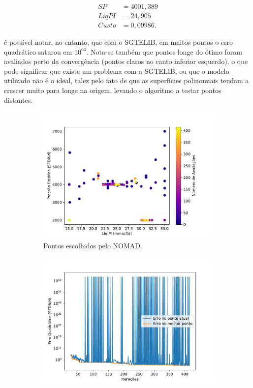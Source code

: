 \begin{align*}
SP&= 4001,389 \\
Liq PI &= 24,905 \\
Custo &= 0,09986.
\end{align*}

é possível notar, no entanto, que com o SGTELIB, em muitos pontos o erro quadrático saturou em $10^{64}$. Nota-se também que pontos longe do ótimo foram avaliados perto da convergência (pontos claros no canto inferior esquerdo), o que pode significar que existe um problema com a SGTELIB, ou que o modelo utilizado não é o ideal, talez pelo fato de que as superfícies polinomiais tendam a crescer muito para longe na origem, levando o algoritmo a testar pontos distantes.

\begin{figure}
\centering
\begin{subfigure}{0.5\textwidth}
  \centering
  \includegraphics[width=1\linewidth]{figs/setup1sgtelib_eval_points.pdf}
  \caption{Pontos escolhidos pelo NOMAD.}
  \label{fig:setup2_points}
\end{subfigure}%
\begin{subfigure}{0.5\textwidth}
  \centering
  \includegraphics[width=1\linewidth]{figs/setup1sgtelib_errors.pdf}

\end{subfigure}
\end{figure}
